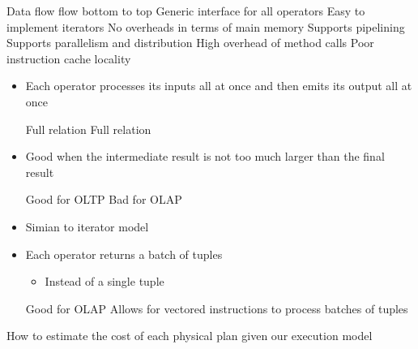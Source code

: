 \begin{itemize}
\begin{itemize}
\begin{itemize}
\begin{itemize}
                        \end{itemize}
                     Data flow flow bottom to top
                    \ipro Generic interface for all operators
                    \ipro Easy to implement iterators
                    \ipro No overheads in terms of main memory
                    \ipro Supports pipelining
                    \ipro Supports parallelism and distribution
                    \icon High overhead of method calls
                    \icon Poor instruction cache locality
                \end{itemize}
                \begin{itemize}
                    \item Each operator processes its inputs all at once and then emits its output all at once
                        \begin{itemize}
                             Full relation
                             Full relation
                        \end{itemize}
                    \item Good when the intermediate result is not too much larger than the final result
                        \begin{itemize}
                            \ipro Good for OLTP
                            \icon Bad for OLAP
                        \end{itemize}
                \end{itemize}
                \begin{itemize}
                    \item Simian to iterator model
                    \item Each operator returns a batch of tuples
                        \begin{itemize}
                            \item Instead of a single tuple
                        \end{itemize}
                    \ipro Good for OLAP
                    \ipro Allows for vectored instructions to process batches of tuples
                \end{itemize}
        \end{itemize}
     How to estimate the cost of each physical plan given our execution model
        \begin{itemize}

\end{itemize}
\end{itemize}

